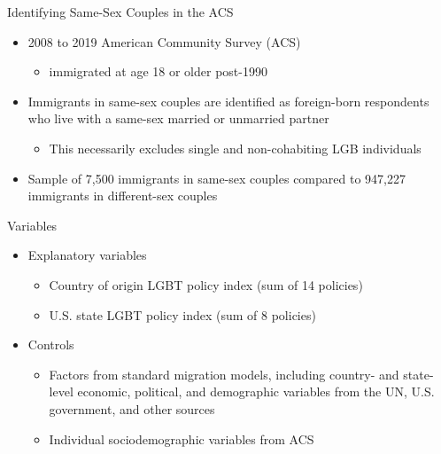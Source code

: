 \documentclass[
  ignorenonframetext,
]{beamer}
\providecommand{\tightlist}{%
  \setlength{\itemsep}{0pt}\setlength{\parskip}{0pt}}
\begin{document}
\begin{frame}{Identifying Same-Sex Couples in the ACS}
\protect\hypertarget{identifying-same-sex-couples-in-the-acs}{}
\begin{itemize}
\tightlist
\item
  2008 to 2019 American Community Survey (ACS)

  \begin{itemize}
  \tightlist
  \item
    immigrated at age 18 or older post-1990
  \end{itemize}
\item
  Immigrants in same-sex couples are identified as foreign-born
  respondents who live with a same-sex married or unmarried partner

  \begin{itemize}
  \tightlist
  \item
    This necessarily excludes single and non-cohabiting LGB individuals
  \end{itemize}
\item
  Sample of 7,500 immigrants in same-sex couples compared to 947,227
  immigrants in different-sex couples
\end{itemize}
\end{frame}

\begin{frame}{Variables}
\protect\hypertarget{variables}{}
\begin{itemize}
\tightlist
\item
  Explanatory variables

  \begin{itemize}
  \tightlist
  \item
    Country of origin LGBT policy index (sum of 14 policies)
  \item
    U.S. state LGBT policy index (sum of 8 policies)
  \end{itemize}
\item
  Controls

  \begin{itemize}
  \tightlist
  \item
    Factors from standard migration models, including country- and
    state-level economic, political, and demographic variables from the
    UN, U.S. government, and other sources
  \item
    Individual sociodemographic variables from ACS
  \end{itemize}
\end{itemize}
\end{frame}
\end{document}
